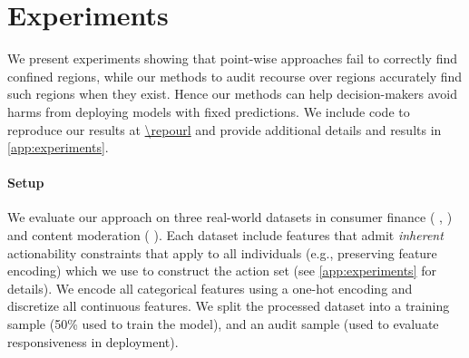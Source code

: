 \section{Experiments} \label{sec:exp}


We present experiments showing that point-wise approaches fail to correctly find confined regions,
while our methods to audit recourse over regions accurately find such regions when they exist. 
Hence our methods can help decision-makers avoid harms from deploying models with fixed predictions.
We include code to reproduce our results at \url{\repourl} and provide additional details and results in \cref{app:experiments}.

\paragraph{Setup}

We evaluate our approach on three real-world datasets in consumer finance ( \cite{fico}, \cite{data2018givemecredit}) and content moderation ( \cite{twitterbot}). %
%
Each dataset include features that admit \emph{inherent} actionability constraints that apply to all individuals (e.g., preserving feature encoding) which we use to construct the action set (see \cref{app:experiments} for details). %
%
We encode all categorical features using a one-hot encoding and discretize all continuous features. We split the processed dataset into a training sample (50\% used to train the model), and an audit sample (used to evaluate responsiveness in deployment). 

